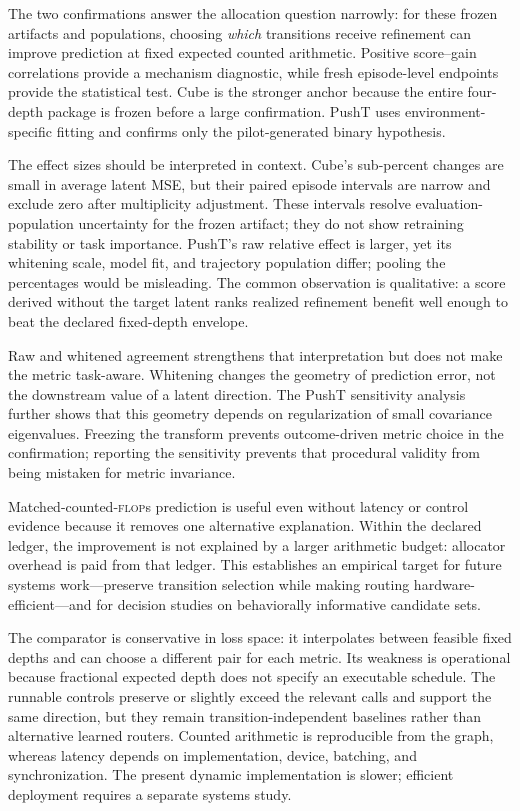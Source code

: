 \documentclass{article}
\newcommand{\flops}{\textsc{flop}s}
\begin{document}
The two confirmations answer the allocation question narrowly: for these frozen artifacts and populations, choosing \emph{which} transitions receive refinement can improve prediction at fixed expected counted arithmetic. Positive score--gain correlations provide a mechanism diagnostic, while fresh episode-level endpoints provide the statistical test. Cube is the stronger anchor because the entire four-depth package is frozen before a large confirmation. PushT uses environment-specific fitting and confirms only the pilot-generated binary hypothesis.

The effect sizes should be interpreted in context. Cube's sub-percent changes are small in average latent MSE, but their paired episode intervals are narrow and exclude zero after multiplicity adjustment. These intervals resolve evaluation-population uncertainty for the frozen artifact; they do not show retraining stability or task importance. PushT's raw relative effect is larger, yet its whitening scale, model fit, and trajectory population differ; pooling the percentages would be misleading. The common observation is qualitative: a score derived without the target latent ranks realized refinement benefit well enough to beat the declared fixed-depth envelope.

Raw and whitened agreement strengthens that interpretation but does not make the metric task-aware. Whitening changes the geometry of prediction error, not the downstream value of a latent direction. The PushT sensitivity analysis further shows that this geometry depends on regularization of small covariance eigenvalues. Freezing the transform prevents outcome-driven metric choice in the confirmation; reporting the sensitivity prevents that procedural validity from being mistaken for metric invariance.

Matched-counted-\flops{} prediction is useful even without latency or control evidence because it removes one alternative explanation. Within the declared ledger, the improvement is not explained by a larger arithmetic budget: allocator overhead is paid from that ledger. This establishes an empirical target for future systems work---preserve transition selection while making routing hardware-efficient---and for decision studies on behaviorally informative candidate sets.

The comparator is conservative in loss space: it interpolates between feasible fixed depths and can choose a different pair for each metric. Its weakness is operational because fractional expected depth does not specify an executable schedule. The runnable controls preserve or slightly exceed the relevant calls and support the same direction, but they remain transition-independent baselines rather than alternative learned routers. Counted arithmetic is reproducible from the graph, whereas latency depends on implementation, device, batching, and synchronization. The present dynamic implementation is slower; efficient deployment requires a separate systems study.
\end{document}
